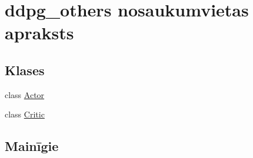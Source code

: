 \hypertarget{namespaceddpg__others}{}\section{ddpg\+\_\+others nosaukumvietas apraksts}
\label{namespaceddpg__others}
\subsection*{Klases}
\begin{DoxyCompactItemize}
\item 
class \hyperlink{classddpg__others_1_1_actor}{Actor}
\item 
class \hyperlink{classddpg__others_1_1_critic}{Critic}
\end{DoxyCompactItemize}
\subsection*{Mainīgie}
